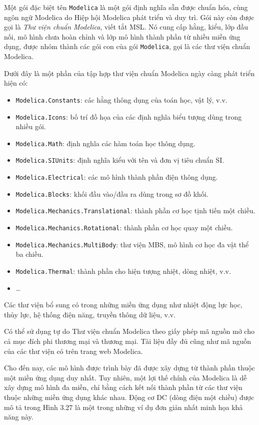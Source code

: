 Một gói đặc biệt tên \texttt{Modelica} là một gói định nghĩa sẵn được chuẩn hóa, cùng ngôn ngữ Modelica do Hiệp hội Modelica phát triển và duy trì. Gói này còn được gọi là \emph{Thư viện chuẩn Modelica}, viết tắt MSL. Nó cung cấp hằng, kiểu, lớp đầu nối, mô hình chưa hoàn chỉnh và lớp mô hình thành phần từ nhiều miền ứng dụng, được nhóm thành các gói con của gói \texttt{Modelica}, gọi là các thư viện chuẩn Modelica.

Dưới đây là một phần của tập hợp thư viện chuẩn Modelica ngày càng phát triển hiện có:
\begin{itemize}
\item \texttt{Modelica.Constants}: các hằng thông dụng của toán học, vật lý, v.v.
\item \texttt{Modelica.Icons}: bố trí đồ họa của các định nghĩa biểu tượng dùng trong nhiều gói.
\item \texttt{Modelica.Math}: định nghĩa các hàm toán học thông dụng.
\item \texttt{Modelica.SIUnits}: định nghĩa kiểu với tên và đơn vị tiêu chuẩn SI.
\item \texttt{Modelica.Electrical}: các mô hình thành phần điện thông dụng.
\item \texttt{Modelica.Blocks}: khối đầu vào/đầu ra dùng trong sơ đồ khối.
\item \texttt{Modelica.Mechanics.Translational}: thành phần cơ học tịnh tiến một chiều.
\item \texttt{Modelica.Mechanics.Rotational}: thành phần cơ học quay một chiều.
\item \texttt{Modelica.Mechanics.MultiBody}: thư viện MBS, mô hình cơ học đa vật thể ba chiều.
\item \texttt{Modelica.Thermal}: thành phần cho hiện tượng nhiệt, dòng nhiệt, v.v.
\item \ldots
\end{itemize}
Các thư viện bổ sung có trong những miền ứng dụng như nhiệt động lực học, thủy lực, hệ thống điện năng, truyền thông dữ liệu, v.v.

Có thể sử dụng tự do Thư viện chuẩn Modelica theo giấy phép mã nguồn mở cho cả mục đích phi thương mại và thương mại. Tài liệu đầy đủ cũng như mã nguồn của các thư viện có trên trang web Modelica.

Cho đến nay, các mô hình được trình bày đã được xây dựng từ thành phần thuộc một miền ứng dụng duy nhất. Tuy nhiên, một lợi thế chính của Modelica là dễ xây dựng mô hình đa miền, chỉ bằng cách kết nối thành phần từ các thư viện thuộc những miền ứng dụng khác nhau. Động cơ DC (dòng điện một chiều) được mô tả trong Hình 3.27 là một trong những ví dụ đơn giản nhất minh họa khả năng này.

